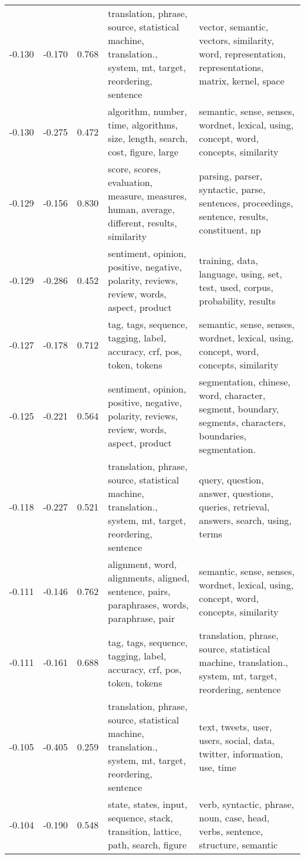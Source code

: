\begin{tabular}{cccp{5cm}p{5cm}}
-0.130 & -0.170 & 0.768 & translation, phrase, source, statistical machine, translation., system, mt, target, reordering, sentence & vector, semantic, vectors, similarity, word, representation, representations, matrix, kernel, space \\
-0.130 & -0.275 & 0.472 & algorithm, number, time, algorithms, size, length, search, cost, figure, large & semantic, sense, senses, wordnet, lexical, using, concept, word, concepts, similarity \\
-0.129 & -0.156 & 0.830 & score, scores, evaluation, measure, measures, human, average, different, results, similarity & parsing, parser, syntactic, parse, sentences, proceedings, sentence, results, constituent, np \\
-0.129 & -0.286 & 0.452 & sentiment, opinion, positive, negative, polarity, reviews, review, words, aspect, product & training, data, language, using, set, test, used, corpus, probability, results \\
-0.127 & -0.178 & 0.712 & tag, tags, sequence, tagging, label, accuracy, crf, pos, token, tokens & semantic, sense, senses, wordnet, lexical, using, concept, word, concepts, similarity \\
-0.125 & -0.221 & 0.564 & sentiment, opinion, positive, negative, polarity, reviews, review, words, aspect, product & segmentation, chinese, word, character, segment, boundary, segments, characters, boundaries, segmentation. \\
-0.118 & -0.227 & 0.521 & translation, phrase, source, statistical machine, translation., system, mt, target, reordering, sentence & query, question, answer, questions, queries, retrieval, answers, search, using, terms \\
-0.111 & -0.146 & 0.762 & alignment, word, alignments, aligned, sentence, pairs, paraphrases, words, paraphrase, pair & semantic, sense, senses, wordnet, lexical, using, concept, word, concepts, similarity \\
-0.111 & -0.161 & 0.688 & tag, tags, sequence, tagging, label, accuracy, crf, pos, token, tokens & translation, phrase, source, statistical machine, translation., system, mt, target, reordering, sentence \\
-0.105 & -0.405 & 0.259 & translation, phrase, source, statistical machine, translation., system, mt, target, reordering, sentence & text, tweets, user, users, social, data, twitter, information, use, time \\
-0.104 & -0.190 & 0.548 & state, states, input, sequence, stack, transition, lattice, path, search, figure & verb, syntactic, phrase, noun, case, head, verbs, sentence, structure, semantic \\

\end{tabular}
